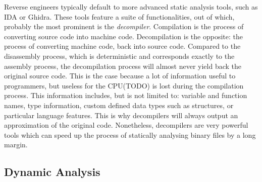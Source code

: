 Reverse engineers typically default to more advanced static analysis tools, such as IDA or Ghidra. These tools feature a suite of functionalities, out of which, probably the most prominent is the \emph{decompiler}. Compilation is the process of converting source code into machine code. Decompilation is the opposite: the process of converting machine code, back into source code. Compared to the disassembly process, which is deterministic and corresponds exactly to the assembly process, the decompilation process will almost never yield back the original source code. This is the case because a lot of information useful to programmers, but useless for the CPU(TODO) is lost during the compilation process. This information includes, but is not limited to: variable and function names, type information, custom defined data types such as structures, or particular language features. This is why decompilers will always output an approximation of the original code. Nonetheless, decompilers are very powerful tools which can speed up the process of statically analysing binary files by a long margin.

\subsection{Dynamic Analysis}



